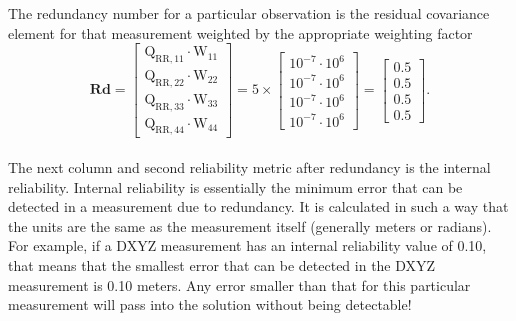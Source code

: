 The redundancy number for a particular observation is the residual covariance element for that measurement weighted by the appropriate weighting factor
\begin{equation}
\mathbf{Rd}=\left[\begin{array}{c}\text{Q}_{\text{RR},11}\cdot\text{W}_{11}\\\text{Q}_{\text{RR},22}\cdot\text{W}_{22}\\\text{Q}_{\text{RR},33}\cdot\text{W}_{33}\\\text{Q}_{\text{RR},44}\cdot\text{W}_{44}\end{array}\right]=5\times\left[\begin{array}{c}10^{-7}\cdot10^6\\10^{-7}\cdot10^6\\10^{-7}\cdot10^6\\10^{-7}\cdot10^6\end{array}\right]=\left[\begin{array}{c}0.5\\0.5\\0.5\\0.5\end{array}\right].
\end{equation}
{}\\

The next column and second reliability metric after redundancy is the internal reliability. Internal reliability is essentially the minimum error that can be detected in a measurement due to redundancy. It is calculated in such a way that the units are the same as the measurement itself (generally meters or radians). For example, if a DXYZ measurement has an internal reliability value of 0.10, that means that the smallest error that can be detected in the DXYZ measurement is 0.10 meters. Any error smaller than that for this particular measurement will pass into the solution without being detectable!

